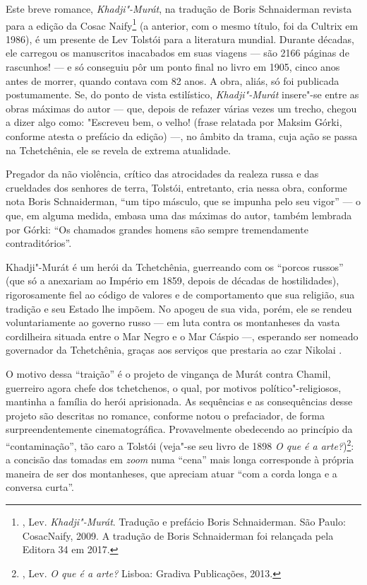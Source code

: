 {{Este breve romance, \emph{Khadji"-Murát}, na tradução de Boris
Schnaiderman revista para a edição da Cosac Naify\footnote{,
  Lev. \emph{Khadji"-Murát}. Tradução e prefácio Boris Schnaiderman. São
  Paulo: CosacNaify, 2009. A tradução de Boris Schnaiderman foi
  relançada pela Editora 34 em 2017.} (a anterior, com o mesmo título,
foi da Cultrix em 1986), é um presente de Lev Tolstói para a literatura
mundial. Durante décadas, ele carregou os manuscritos inacabados em suas
viagens --- são 2166 páginas de rascunhos! --- e só conseguiu pôr um
ponto final no livro em 1905, cinco anos antes de morrer, quando contava
com 82 anos. A obra, aliás, só foi publicada postumamente. Se, do ponto
de vista estilístico, \emph{Khadji"-Murát} insere"-se entre as
obras máximas do autor --- que, depois de refazer várias vezes um trecho,
chegou a dizer algo como: "Escreveu bem, o velho! (frase relatada por
Maksim Górki, conforme atesta o prefácio da edição) ---, no âmbito da
trama, cuja ação se passa na Tchetchênia, ele se revela de extrema
atualidade.

Pregador da não violência, crítico das atrocidades da realeza russa e
das crueldades dos senhores de terra, Tolstói, entretanto, cria nessa
obra, conforme nota Boris Schnaiderman, ``um tipo másculo, que se impunha
pelo seu vigor'' --- o que, em alguma medida, embasa uma das máximas do
autor, também lembrada por Górki: ``Os chamados grandes homens são sempre
tremendamente contraditórios''.

Khadji"-Murát é um herói da Tchetchênia, guerreando com os ``porcos
russos'' (que só a anexariam ao Império em 1859, depois de décadas de
hostilidades), rigorosamente fiel ao código de valores e de
comportamento que sua religião, sua tradição e seu Estado lhe impõem. No
apogeu de sua vida, porém, ele se rendeu voluntariamente ao governo
russo --- em luta contra os montanheses da vasta cordilheira situada
entre o Mar Negro e o Mar Cáspio ---, esperando ser nomeado governador da
Tchetchênia, graças aos serviços que prestaria ao czar Nikolai .

O motivo dessa ``traição'' é o projeto de vingança de Murát contra Chamil,
guerreiro agora chefe dos tchetchenos, o qual, por motivos
político"-religiosos, mantinha a família do herói aprisionada. As
sequências e as consequências desse projeto são descritas no romance,
conforme notou o prefaciador, de forma surpreendentemente
cinematográfica. Provavelmente obedecendo ao princípio da
``contaminação'', tão caro a Tolstói (veja"-se seu livro de 1898 \emph{O
que é a arte?})\footnote{, Lev. \emph{O que é a arte?} Lisboa:
  Gradiva Publicações, 2013.}: a concisão das tomadas em \emph{zoom}
numa ``cena'' mais longa corresponde à própria maneira de ser dos
montanheses, que apreciam atuar ``com a corda longa e a conversa curta''.

}}
